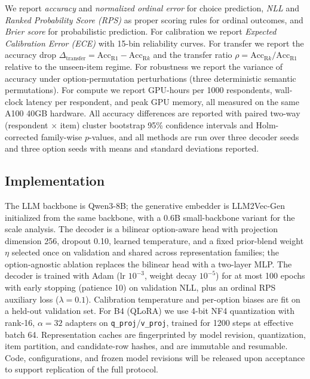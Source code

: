 We report \emph{accuracy} and \emph{normalized ordinal error} for choice prediction, \emph{NLL} and \emph{Ranked Probability Score (RPS)} as proper scoring rules for ordinal outcomes, and \emph{Brier score} for probabilistic prediction. For calibration we report \emph{Expected Calibration Error (ECE)} with 15-bin reliability curves. For transfer we report the accuracy drop $\Delta_{\text{transfer}} = \text{Acc}_{\text{R1}} - \text{Acc}_{\text{R}k}$ and the transfer ratio $\rho = \text{Acc}_{\text{R}k}/\text{Acc}_{\text{R1}}$ relative to the unseen-item regime. For robustness we report the variance of accuracy under option-permutation perturbations (three deterministic semantic permutations). For compute we report GPU-hours per 1000 respondents, wall-clock latency per respondent, and peak GPU memory, all measured on the same A100 40GB hardware. All accuracy differences are reported with paired two-way (respondent $\times$ item) cluster bootstrap 95\% confidence intervals and Holm-corrected family-wise $p$-values, and all methods are run over three decoder seeds and three option seeds with means and standard deviations reported.

\subsection{Implementation}
\label{sec:implementation}

The LLM backbone is Qwen3-8B; the generative embedder is LLM2Vec-Gen initialized from the same backbone, with a 0.6B small-backbone variant for the scale analysis. The decoder is a bilinear option-aware head with projection dimension 256, dropout 0.10, learned temperature, and a fixed prior-blend weight $\eta$ selected once on validation and shared across representation families; the option-agnostic ablation replaces the bilinear head with a two-layer MLP. The decoder is trained with Adam (lr $10^{-3}$, weight decay $10^{-5}$) for at most 100 epochs with early stopping (patience 10) on validation NLL, plus an ordinal RPS auxiliary loss ($\lambda=0.1$). Calibration temperature and per-option biases are fit on a held-out validation set. For B4 (QLoRA) we use 4-bit NF4 quantization with rank-16, $\alpha=32$ adapters on \texttt{q\_proj}/\texttt{v\_proj}, trained for 1200 steps at effective batch 64. Representation caches are fingerprinted by model revision, quantization, item partition, and candidate-row hashes, and are immutable and resumable. Code, configurations, and frozen model revisions will be released upon acceptance to support replication of the full protocol.
